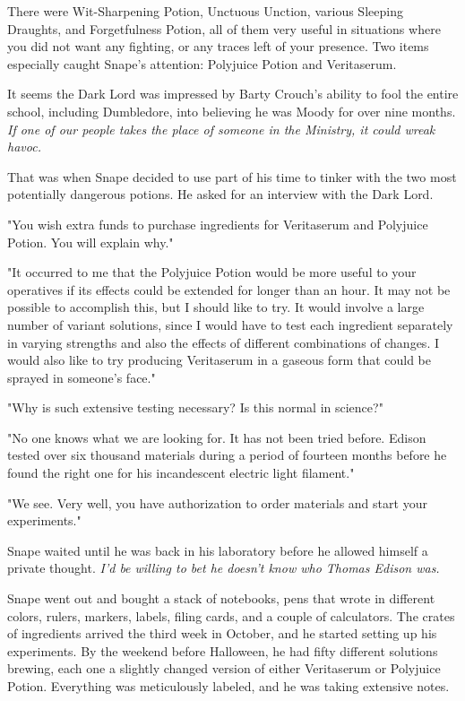 There were Wit-Sharpening Potion, Unctuous Unction, various Sleeping Draughts, and Forgetfulness Potion, all of them very useful in situations where you did not want any fighting, or any traces left of your presence. Two items especially caught Snape's attention: Polyjuice Potion and Veritaserum.

It seems the Dark Lord was impressed by Barty Crouch's ability to fool the entire school, including Dumbledore, into believing he was Moody for over nine months. \emph{If one of our people takes the place of someone in the Ministry, it could wreak havoc.}

That was when Snape decided to use part of his time to tinker with the two most potentially dangerous potions. He asked for an interview with the Dark Lord.

"You wish extra funds to purchase ingredients for Veritaserum and Polyjuice Potion. You will explain why."

"It occurred to me that the Polyjuice Potion would be more useful to your operatives if its effects could be extended for longer than an hour. It may not be possible to accomplish this, but I should like to try. It would involve a large number of variant solutions, since I would have to test each ingredient separately in varying strengths and also the effects of different combinations of changes. I would also like to try producing Veritaserum in a gaseous form that could be sprayed in someone's face."

"Why is such extensive testing necessary? Is this normal in science?"

"No one knows what we are looking for. It has not been tried before. Edison tested over six thousand materials during a period of fourteen months before he found the right one for his incandescent electric light filament."

"We see. Very well, you have authorization to order materials and start your experiments."

Snape waited until he was back in his laboratory before he allowed himself a private thought. \emph{I'd be willing to bet he doesn't know who Thomas Edison was.}

\sbreak

Snape went out and bought a stack of notebooks, pens that wrote in different colors, rulers, markers, labels, filing cards, and a couple of calculators. The crates of ingredients arrived the third week in October, and he started setting up his experiments. By the weekend before Halloween, he had fifty different solutions brewing, each one a slightly changed version of either Veritaserum or Polyjuice Potion. Everything was meticulously labeled, and he was taking extensive notes.

